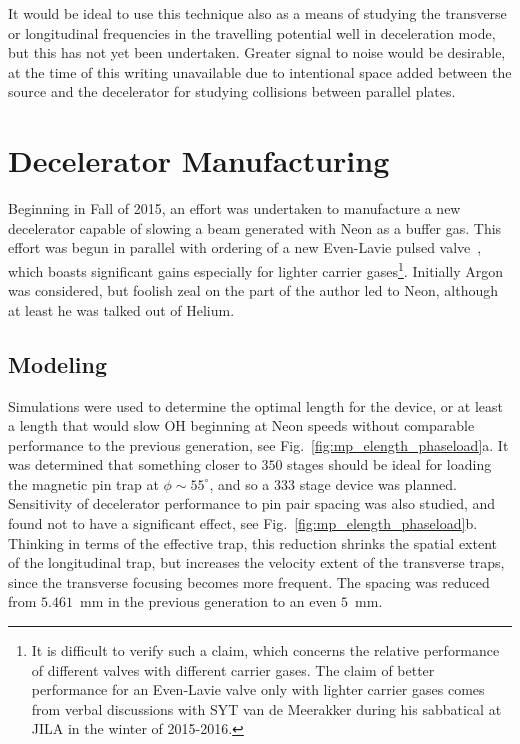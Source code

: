 It would be ideal to use this technique also as a means of studying the transverse or longitudinal frequencies in the travelling potential well in deceleration mode, but this has not yet been undertaken. 
Greater signal to noise would be desirable, at the time of this writing unavailable due to intentional space added between the source and the decelerator for studying collisions between parallel plates.


\section{Decelerator Manufacturing}

Beginning in Fall of 2015, an effort was undertaken to manufacture a new decelerator capable of slowing a beam generated with Neon as a buffer gas. 
This effort was begun in parallel with ordering of a new Even-Lavie pulsed valve~\cite{Even2015}, which boasts significant gains especially for lighter carrier gases\footnote{It is difficult to verify such a claim, which concerns the relative performance of different valves with different carrier gases. The claim of better performance for an Even-Lavie valve only with lighter carrier gases comes from verbal discussions with SYT van de Meerakker during his sabbatical at JILA in the winter of 2015-2016.}.
Initially Argon was considered, but foolish zeal on the part of the author led to Neon, although at least he was talked out of Helium.

\subsection{Modeling}

Simulations were used to determine the optimal length for the device, or at least a length that would slow OH beginning at Neon speeds without comparable performance to the previous generation, see Fig.~\ref{fig:mp_elength_phaseload}a.
It was determined that something closer to $350$ stages should be ideal for loading the magnetic pin trap at $\phi\sim 55^\circ$, and so a $333$ stage device was planned.
Sensitivity of decelerator performance to pin pair spacing was also studied, and found not to have a significant effect, see Fig.~\ref{fig:mp_elength_phaseload}b.
Thinking in terms of the effective trap, this reduction shrinks the spatial extent of the longitudinal trap, but increases the velocity extent of the transverse traps, since the transverse focusing becomes more frequent.
The spacing was reduced from $5.461$~mm in the previous generation to an even $5$~mm.

